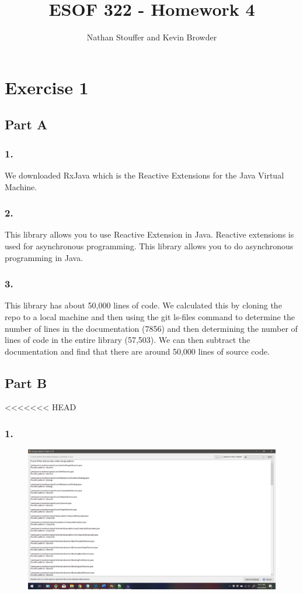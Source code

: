 \documentclass{article}
\begin{document}
	
\title{ESOF 322 - Homework 4}
\author{Nathan Stouffer and Kevin Browder}

\maketitle
\newpage

\section*{Exercise 1}

\subsection*{Part A}
\subsubsection*{1.}
We downloaded RxJava which is the Reactive Extensions for the Java Virtual Machine.
\subsubsection*{2.}
This library allows you to use Reactive Extension in Java. Reactive extensions is used for asynchronous programming. This library allows you to do asynchronous programming in Java.
\subsubsection*{3.}
This library has about 50,000 lines of code. We calculated this by cloning the repo to a local machine and then using the git ls-files command to determine the number of lines in the documentation (7856) and then determining the number of lines of code in the entire library (57,503). We can then subtract the documentation and find that there are around 50,000 lines of source code.
\subsection*{Part B}
<<<<<<< HEAD
\subsubsection*{1.}
\begin{figure}[h]
	\centering
	\includegraphics[width=6in]{hw4-patterns.png}
\end{figure}
\end{document}
